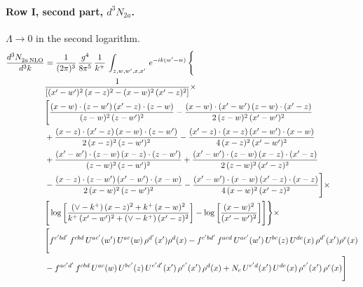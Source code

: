 \documentclass[10pt]{article}
\numberwithin{equation}{section}
\begin{document}
\paragraph{Row I, second part, $d^3N_{2a}$.}
$\Lambda\to0$ in the second logarithm.
\begin{align}
    \frac{d^{3}N_{2a\,\rm NLO}^{\rm}}{d^{3}k}  & =  \frac{1}{(2\pi)^{3}}\, \frac{g^{4}}{8\pi^{5}}\,\frac{1}{k^{+}}\,\int_{z,w,w^{\prime},x,x'}\, e^{-ik(w^{\prime}-w)}\, \Bigg\{\notag \\
& \frac{1}{\left[(x'-w')^{2}\, (x-z)^{2}-(x-w)^{2}\, (x'-z)^{2}\right]}\times\,\notag \\ & \Bigg[\frac{(x-w)\cdot (z-w')\, (x'-z)\cdot (z-w)}{(z-w)^{2}\,(z-w')^{2}}-\frac{(x-w)\cdot (x'-w')\, (z-w)\cdot (x'-z)}{2\, (z-w)^{2}\, (x'-w')^{2}}\notag \\ & + \frac{(x-z)\cdot (x'-z)\, (x-w)\cdot (z-w')}{2\, (x-z)^{2}\, (z-w')^{2}}-\frac{(x'-z)\cdot (x-z)\, (x'-w')\cdot (x-w)}{4\, (x-z)^{2}\, (x'-w')^{2}}\notag \\ & + \frac{(x'-w')\cdot (z-w)\, (x-z)\cdot (z-w')}{(z-w)^{2}\,(z-w')^{2}}+\frac{(x'-w')\cdot (z-w)\, (x-z)\cdot (x'-z)}{2\, (z-w)^{2}\, (x'-z)^{2}}\notag \\ & - \frac{(x-z)\cdot (z-w')\, (x'-w')\cdot (x-w)}{2\, (x-w)^{2}\, (z-w')^{2}} -\frac{(x'-w')\cdot (x-w)\, (x'-z)\cdot (x-z)}{4\, (x-w)^{2}\, (x'-z)^{2}}\Bigg]\times\notag \\ &  \Bigg[\log{\left[\frac{(\vee-k^{+})\,(x-z)^{2}+k^{+}\,(x-w)^{2}}{k^{+}\, (x'-w')^{2} + (\vee-k^{+})\, (x'-z)^{2}}\right]}-\log{\left[\frac{(x-w)^{2}}{(x'-w')^{2}}\right]}\Bigg]\Bigg\} \times\, \notag \\ & \Bigg[f^{c'bd'}\,f^{cbd}\, U^{ac'}(w')\,U^{ac}(w)\,\rho^{d'}(x')\rho^{d}(x)- f^{c'bd'}\,f^{acd}\,U^{ac'}(w')\,U^{bc}(z)\,U^{de}(x)\,\rho^{d'}(x')\rho^{e}(x) \notag \\ & -f^{ac'd'}\,f^{cbd}\,U^{ac}(w)\,U^{bc'}(z)\,U^{e'd'}(x')\,\rho^{e'}(x')\,\rho^{d}(x) +N_{c}\,U^{e'd}(x')\,U^{de}(x)\,\rho^{e'}(x')\,\rho^{e}(x)\Bigg] \label{eq:R:G2I2a}
\end{align}
\end{document}
